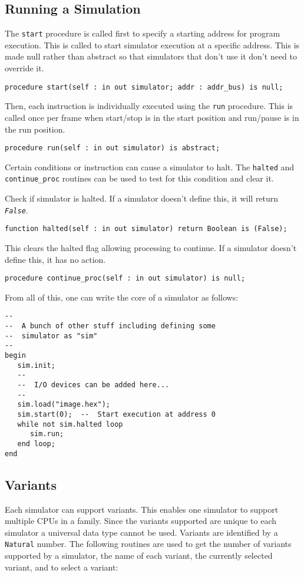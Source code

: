 \documentclass[10pt, openany]{book}
\newcommand{\function}[1]{\texttt{#1}}
\newcommand{\constant}[1]{\emph{\texttt{#1}}}
\begin{document}
\subsection{Running a Simulation}
The \function{start} procedure is called first to specify a starting address for program execution.  This is called to start simulator execution at a specific address.  This is made null rather than abstract so that simulators that don't use it don't need to override it.
\begin{lstlisting}
procedure start(self : in out simulator; addr : addr_bus) is null;
\end{lstlisting}
Then, each instruction is individually executed using the \function{run} procedure.  This is called once per frame when start/stop is in the start position and run/pause is in the run position.
\begin{lstlisting}
procedure run(self : in out simulator) is abstract;
\end{lstlisting}
Certain conditions or instruction can cause a simulator to halt.  The \function{halted} and \function{continue\_proc} routines can be used to test for this condition and clear it.

Check if simulator is halted.  If a simulator doesn't define this, it will return \constant{False}.
\begin{lstlisting}
function halted(self : in out simulator) return Boolean is (False);
\end{lstlisting}
This clears the halted flag allowing processing to continue.  If a simulator doesn't define this, it has no action.
\begin{lstlisting}
procedure continue_proc(self : in out simulator) is null;
\end{lstlisting}
From all of this, one can write the core of a simulator as follows:
\begin{lstlisting}
--
--  A bunch of other stuff including defining some
--  simulator as "sim"
--
begin
   sim.init;
   --
   --  I/O devices can be added here...
   --
   sim.load("image.hex");
   sim.start(0);  --  Start execution at address 0
   while not sim.halted loop
      sim.run;
   end loop;
end
\end{lstlisting}

\subsection{Variants}
Each simulator can support variants.  This enables one simulator to support multiple CPUs in a family.  Since the variants supported are unique to each simulator a universal data type cannot be used.  Variants are identified by a \verb|Natural| number.  The following routines are used to get the number of variants supported by a simulator, the name of each variant, the currently selected variant, and to select a variant:
\end{document}
